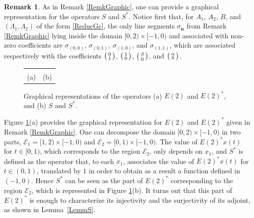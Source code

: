 \documentclass[JEP,XML,SOM,Unicode]{cedram}
\newcommand{\bn}{\boldsymbol{n}}
\newenvironment{smallpmatrix}{\big(\begin{smallmatrix}}{\end{smallmatrix}\big)}
\theoremstyle{plain}
\theoremstyle{definition}
\newtheorem{remk}[theo]{Remark}
\begin{document}
\begin{remk}
\label{RemkGraphicSSAst}
As in Remark \ref{RemkGraphic}, one can provide a graphical representation for the operators $S$ and $S^\ast$. Notice first that, for $A_1$, $A_2$, $B$, and $(\Lambda_1, \Lambda_2)$ of the form \eqref{ReducGc}, the only line segments $\sigma_{\bn}$ from Remark \ref{RemkGraphic} lying inside the domain $[0, 2) \times [-1, 0)$ and associated with non-zero coefficients are $\sigma_{(0, 0)}$, $\sigma_{(0, 1)}$, $\sigma_{(1, 0)}$, and $\sigma_{(1, 1)}$, which are associated respectively with the coefficients $\begin{smallpmatrix}0 \\ 1 \\\end{smallpmatrix}$, $\begin{smallpmatrix}1 \\ 0 \\\end{smallpmatrix}$, $\begin{smallpmatrix}\beta \\ 0 \\\end{smallpmatrix}$, and $\begin{smallpmatrix}\alpha \\ 0 \\\end{smallpmatrix}$.

\newlength{\OneLine}
\setlength{\OneLine}{\baselineskip}

\begin{figure}[ht]
\centering
\begin{tabular}{@{} c @{} c @{}}
\raisebox{-\height+\OneLine}{} & \raisebox{-\height + \OneLine}{} \tabularnewline
(a) & (b) \tabularnewline
\end{tabular}
\caption{Graphical representations of the operators (a) $E(2)$ and $E(2)^\ast$, and (b) $S$ and $S^\ast$.}
\label{FigET2-S}
\end{figure}

Figure \ref{FigET2-S}(a) provides the graphical representation for $E(2)$ and $E(2)^\ast$ given in Remark \ref{RemkGraphic}. One can decompose the domain $[0, 2) \times [-1, 0)$ in two parts, $\mathcal E_1 = [1, 2) \times [-1, 0)$ and $\mathcal E_2 = [0, 1) \times [-1, 0)$. The value of $E(2)^\ast x(t)$ for $t \in [0, 1)$, which corresponds to the region $\mathcal E_2$, only depends on $x_1$, and $S^\ast$ is defined as the operator that, to each $x_1$, associates the value of $E(2)^\ast x(t)$ for $t \in (0, 1)$, translated by $1$ in order to obtain as a result a function defined in $(-1, 0)$. Hence $S^\ast$ can be seen as the part of $E(2)^\ast$ corresponding to the region $\mathcal E_2$, which is represented in Figure \ref{FigET2-S}(b). It turns out that this part of $E(2)^\ast$ is enough to characterize its injectivity and the surjectivity of its adjoint, as shown in Lemma~\ref{LemmS}.


\end{remk}
\end{document}
